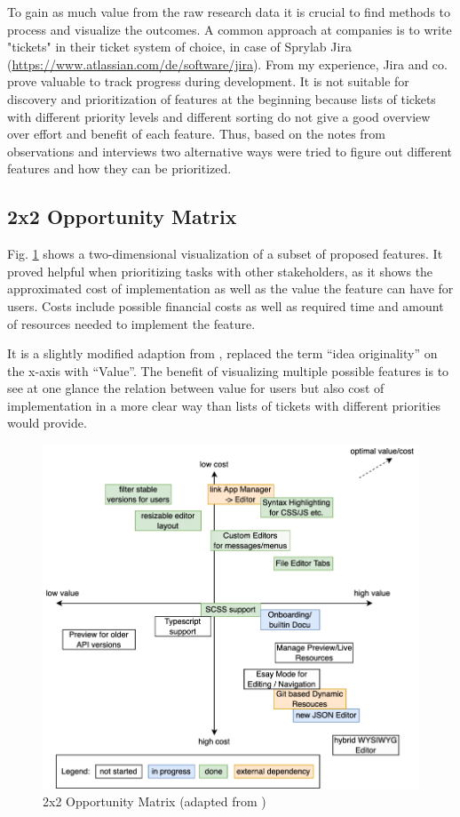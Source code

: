 To gain as much value from the raw research data it is crucial to find methods to process and visualize the outcomes.
A common approach at companies is to write "tickets" in their ticket system of choice, in case of Sprylab Jira (\url{https://www.atlassian.com/de/software/jira}).
From my experience, Jira and co. prove valuable to track progress during development.
It is not suitable for discovery and prioritization of features at the beginning because lists of tickets with different priority levels and different sorting do not give a good overview over effort and benefit of each feature.
Thus, based on the notes from observations and interviews two alternative ways were tried to figure out different features and how they can be prioritized.

\subsection{2x2 Opportunity Matrix}

Fig. \ref{fig:opportunitymatrix} shows a two-dimensional visualization of a subset of proposed features.
It proved helpful when prioritizing tasks with other stakeholders,
as it shows the approximated cost of implementation as well as the value the feature can have for users.
Costs include possible financial costs as well as required time and amount of resources needed to implement the feature.

It is a slightly modified adaption from \cite[p. 181]{LearnHCI:2020ys}, replaced the term ``idea originality'' on the x-axis with ``Value''.
The benefit of visualizing multiple possible features is to see at one glance the relation between value for users but also cost of implementation in a more clear way than lists of tickets with different priorities would provide.

\begin{figure}[h!]
	\centering
  \includegraphics[width=\textwidth]{pics/feature_cost_matrix.drawio.png}
	\caption{2x2 Opportunity Matrix (adapted from \cite[p. 181]{LearnHCI:2020ys})}
	\label{fig:opportunitymatrix}
\end{figure}


